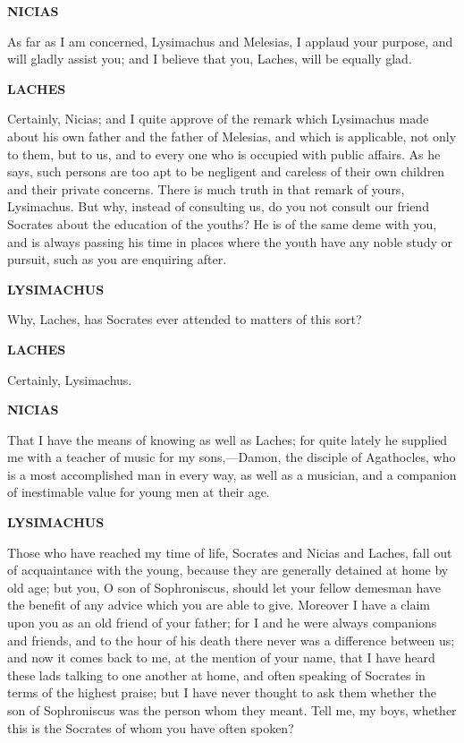 \documentclass[11pt,letter]{book}
\begin{document}
\par \textbf{NICIAS}
\par   As far as I am concerned, Lysimachus and Melesias, I applaud your purpose, and will gladly assist you; and I believe that you, Laches, will be equally glad.

\par \textbf{LACHES}
\par   Certainly, Nicias; and I quite approve of the remark which Lysimachus made about his own father and the father of Melesias, and which is applicable, not only to them, but to us, and to every one who is occupied with public affairs. As he says, such persons are too apt to be negligent and careless of their own children and their private concerns. There is much truth in that remark of yours, Lysimachus. But why, instead of consulting us, do you not consult our friend Socrates about the education of the youths? He is of the same deme with you, and is always passing his time in places where the youth have any noble study or pursuit, such as you are enquiring after.

\par \textbf{LYSIMACHUS}
\par   Why, Laches, has Socrates ever attended to matters of this sort?

\par \textbf{LACHES}
\par   Certainly, Lysimachus.

\par \textbf{NICIAS}
\par   That I have the means of knowing as well as Laches; for quite lately he supplied me with a teacher of music for my sons,—Damon, the disciple of Agathocles, who is a most accomplished man in every way, as well as a musician, and a companion of inestimable value for young men at their age.

\par \textbf{LYSIMACHUS}
\par   Those who have reached my time of life, Socrates and Nicias and Laches, fall out of acquaintance with the young, because they are generally detained at home by old age; but you, O son of Sophroniscus, should let your fellow demesman have the benefit of any advice which you are able to give. Moreover I have a claim upon you as an old friend of your father; for I and he were always companions and friends, and to the hour of his death there never was a difference between us; and now it comes back to me, at the mention of your name, that I have heard these lads talking to one another at home, and often speaking of Socrates in terms of the highest praise; but I have never thought to ask them whether the son of Sophroniscus was the person whom they meant. Tell me, my boys, whether this is the Socrates of whom you have often spoken?
\end{document}
